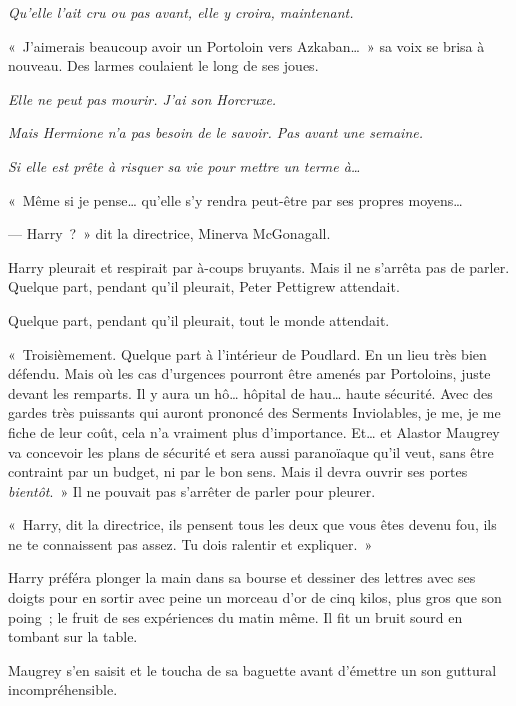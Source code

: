 \emph{Qu'elle l'ait cru ou pas avant, elle y croira, maintenant.}

«~J'aimerais beaucoup avoir un Portoloin vers Azkaban…~»
sa voix se brisa à nouveau.
Des larmes coulaient le long de ses joues.

\emph{Elle ne peut pas mourir.
J'ai son Horcruxe.}

\emph{Mais Hermione n'a pas besoin de le savoir.
Pas avant une semaine.}

\emph{Si elle est prête à risquer sa vie pour mettre un terme à…}

«~Même si je pense… qu'elle s'y rendra peut-être par ses propres moyens…

--- Harry~?~»
dit la directrice, Minerva McGonagall.

Harry pleurait et respirait par à-coups bruyants.
Mais il ne s'arrêta pas de parler.
Quelque part, pendant qu'il pleurait, Peter Pettigrew attendait.

Quelque part, pendant qu'il pleurait, tout le monde attendait.

«~Troisièmement.
Quelque part à l'intérieur de Poudlard.
En un lieu très bien défendu.
Mais où les cas d'urgences pourront être amenés par Portoloins, juste devant les remparts.
Il y aura un hô… hôpital de hau… haute sécurité.
Avec des gardes très puissants qui auront prononcé des Serments Inviolables, je me, je me fiche de leur coût, cela n'a vraiment plus d'importance.
Et… et Alastor Maugrey va concevoir les plans de sécurité et sera aussi paranoïaque qu'il veut, sans être contraint par un budget, ni par le bon sens.
Mais il devra ouvrir ses portes \emph{bientôt}.~»
Il ne pouvait pas s'arrêter de parler pour pleurer.

«~Harry, dit la directrice, ils pensent tous les deux que vous êtes devenu fou, ils ne te connaissent pas assez.
Tu dois ralentir et expliquer.~»

Harry préféra plonger la main dans sa bourse et dessiner des lettres avec ses doigts pour en sortir avec peine un morceau d'or de cinq kilos, plus gros que son poing~; le fruit de ses expériences du matin même.
Il fit un bruit sourd en tombant sur la table.

Maugrey s'en saisit et le toucha de sa baguette avant d'émettre un son guttural incompréhensible.

